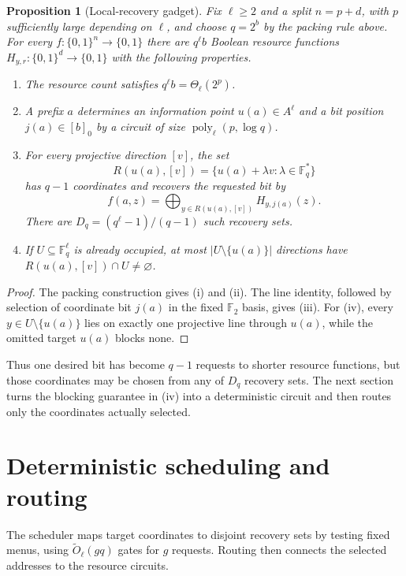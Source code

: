 \documentclass[11pt]{article}
\newtheorem{proposition}[proposition]{Proposition}
\newcommand{\bits}{\{0,1\}}
\newcommand{\F}{\mathbb{F}}
\newcommand{\poly}{\operatorname{poly}}
\newcommand{\bigxor}{\bigoplus}
\begin{document}
\begin{proposition}[Local-recovery gadget]\label{prop:local-gadget}
Fix $\ell\ge2$ and a split $n=p+d$, with $p$ sufficiently large depending on
$\ell$, and choose $q=2^b$ by the packing rule above.  For every
$f:\bits^n\to\bits$ there are $q^\ell b$ Boolean resource functions
$H_{y,r}:\bits^d\to\bits$ with the following properties.
\begin{enumerate}[label=\textup{(\roman*)},leftmargin=2.1em]
\item The resource count satisfies $q^\ell b=\Theta_\ell(2^p)$.
\item A prefix $a$ determines an information point $u(a)\in A^\ell$ and a bit
position $j(a)\in[b]_0$ by a circuit of size $\poly_\ell(p,\log q)$.
\item For every projective direction $[v]$, the set
\[
  R(u(a),[v])=\{u(a)+\lambda v:\lambda\in\F_q^*\}
\]
has $q-1$ coordinates and recovers the requested bit by
\[
  f(a,z)=\bigxor_{y\in R(u(a),[v])}H_{y,j(a)}(z).
\]
There are $D_q=(q^\ell-1)/(q-1)$ such recovery sets.
\item If $U\subseteq\F_q^\ell$ is already occupied, at most
$|U\setminus\{u(a)\}|$ directions have
$R(u(a),[v])\cap U\ne\varnothing$.
\end{enumerate}
\end{proposition}

\begin{proof}
The packing construction gives (i) and (ii).  The line identity, followed by
selection of coordinate bit $j(a)$ in the fixed $\F_2$ basis, gives (iii).
For (iv), every $y\in U\setminus\{u(a)\}$ lies on exactly one projective line
through $u(a)$, while the omitted target $u(a)$ blocks none.
\end{proof}

Thus one desired bit has become $q-1$ requests to shorter resource functions,
but those coordinates may be chosen from any of $D_q$ recovery sets.  The next
section turns the blocking guarantee in (iv) into a deterministic circuit and
then routes only the coordinates actually selected.

\section{Deterministic scheduling and routing}\label{sec:scheduling}

The scheduler maps target coordinates to disjoint recovery sets by testing
fixed menus, using $\widetilde O_\ell(gq)$ gates for $g$ requests.  Routing
then connects the selected addresses to the resource circuits.
\end{document}

